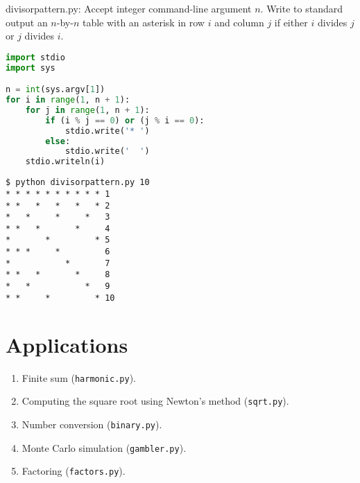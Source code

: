 \documentclass[8pt,a4paper,compress,handout]{beamer}
\begin{document}
\begin{frame}[fragile]
\begin{framed}
\tiny divisorpattern.py: Accept integer command-line argument $n$. Write to standard output an $n$-by-$n$ table with an asterisk in row $i$ and column $j$ if either $i$ divides $j$ or $j$ divides $i$.
\end{framed}

\begin{lstlisting}[language=Python]
import stdio
import sys

n = int(sys.argv[1])
for i in range(1, n + 1):
    for j in range(1, n + 1):
        if (i % j == 0) or (j % i == 0):
            stdio.write('* ')
        else:
            stdio.write('  ')
    stdio.writeln(i)
\end{lstlisting}

\begin{lstlisting}[language={}]
$ python divisorpattern.py 10
* * * * * * * * * * 1
* *   *   *   *   * 2
*   *     *     *   3
* *   *       *     4
*       *         * 5
* * *     *         6
*           *       7
* *   *       *     8
*   *           *   9
* *     *         * 10
\end{lstlisting}
\end{frame}

\section{Applications}
\begin{frame}[fragile]
\begin{enumerate}
\item Finite sum (\lstinline{harmonic.py}).

\item Computing the square root using Newton's method (\lstinline{sqrt.py}).

\item Number conversion (\lstinline{binary.py}).

\item Monte Carlo simulation (\lstinline{gambler.py}).

\item Factoring (\lstinline{factors.py}).
\end{enumerate}
\end{frame}
\end{document}
